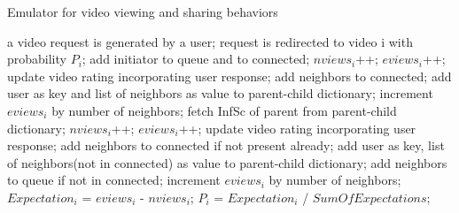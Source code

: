 \documentclass[a4paper, 10pt]{article}
\title{}
\author{}
\date{}
\begin{document}
\maketitle
\begin{algorithm}
\caption{Emulator for video viewing and sharing behaviors}\label{alg:emulator}
\begin{algorithmic}
	\State a video request is generated by a user;
	\State request is redirected to video i with probability $P_i$;
	\State add initiator to queue and to connected;
			\State $nviews_i$++;
			\State $eviews_i$++;
			\State update video rating incorporating user response;
			\State add neighbors to connected;
			\State add user as key and list of neighbors as value to parent-child dictionary;
			\State increment $eviews_i$ by number of neighbors;
		\Else
			\State fetch InfSc of parent from parent-child dictionary;
				\State $nviews_i$++;
				\State $eviews_i$++;
				\State update video rating incorporating user response;
			\EndIf
				\State add neighbors to connected if not present already;
				\State add user as key, list of neighbors(not in connected) as value to parent-child dictionary;
				\State add neighbors to queue if not in connected;
				\State increment $eviews_i$ by number of neighbors;
			\EndIf
		\EndIf
	\EndFor
	\State $Expectation_i$ = $eviews_i$ - $nviews_i$;
	\State $P_i$ = $Expectation_i$ / $SumOfExpectations$;
\EndFor
\end{algorithmic}
\end{algorithm}
\end{document}
